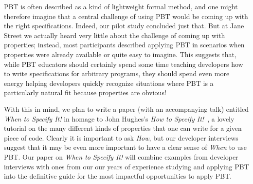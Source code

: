 
PBT is often described as a kind of lightweight formal method, and one
might therefore imagine that a central challenge of using PBT would be
coming up with the
right specifications. Indeed, our pilot study concluded just that. But at
Jane Street we actually heard very little about the challenge of coming up with
properties; instead, most participants described applying PBT in scenarios when
properties were already available or quite easy to imagine. This suggests that,
while PBT educators should certainly spend some time teaching developers how to
write specifications for arbitrary programs, they should spend even more energy
helping developers quickly recognize  situations where PBT is a particularly
natural fit because properties are obvious!

With this in mind, we plan to write a paper
(with an accompanying talk)
entitled {\em When to Specify It!} in homage to
John Hughes's {\em How to Specify It!}~\cite{HowToSpecifyIt}, a lovely
tutorial on the many different kinds of properties that one can write
for a given piece
of code. Clearly it is important to ask {\em How}, but our developer interviews
suggest that it may be even more important to have a clear sense of {\em When}
to use PBT. Our paper on {\em When to Specify It!} will combine examples from developer
interviews with ones from our our years of experience studying and applying PBT
into the definitive guide for the most impactful opportunities to apply PBT.
\iflater{}
\fi

